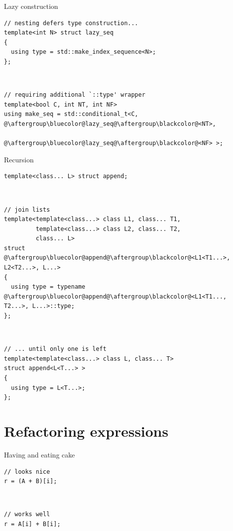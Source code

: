 \documentclass[xcolor=dvipsnames]{beamer}
\begin{document}
\begin{frame}[fragile]{Lazy construction}
\begin{lstlisting}
// nesting defers type construction...
template<int N> struct lazy_seq
{
  using type = std::make_index_sequence<N>;
};
\end{lstlisting}

~

\begin{lstlisting}
// requiring additional `::type' wrapper
template<bool C, int NT, int NF>
using make_seq = std::conditional_t<C, @\aftergroup\bluecolor@lazy_seq@\aftergroup\blackcolor@<NT>,
                                       @\aftergroup\bluecolor@lazy_seq@\aftergroup\blackcolor@<NF> >;
\end{lstlisting}
\end{frame}


\begin{frame}[fragile]{Recursion}
\begin{lstlisting}
template<class... L> struct append;
\end{lstlisting}

~

\begin{lstlisting}
// join lists
template<template<class...> class L1, class... T1,
         template<class...> class L2, class... T2,
         class... L>
struct @\aftergroup\bluecolor@append@\aftergroup\blackcolor@<L1<T1...>, L2<T2...>, L...>
{
  using type = typename @\aftergroup\bluecolor@append@\aftergroup\blackcolor@<L1<T1..., T2...>, L...>::type;
};
\end{lstlisting}

~

\begin{lstlisting}
// ... until only one is left
template<template<class...> class L, class... T>
struct append<L<T...> >
{
  using type = L<T...>;
};
\end{lstlisting}
\end{frame}


\section{Refactoring expressions}


\begin{frame}[fragile]{Having and eating cake}
\begin{lstlisting}
// looks nice
r = (A + B)[i];
\end{lstlisting}

~

\begin{lstlisting}
// works well
r = A[i] + B[i];
\end{lstlisting}
\end{frame}
\end{document}
